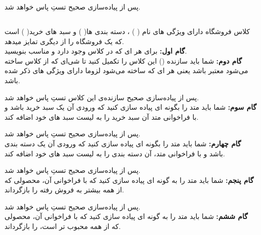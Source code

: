     پس از پیاده‌سازی صحیح تستِ 
    \grayBox{\textcolor{dkgreen}{CartCalculatePriceTest}}
    پاس خواهد شد.
    \subsection{ }
    کلاس فروشگاه دارای ویژگی های 
    نام (
    \grayBox{\textcolor{navyBlue}{Name}}
    )
    ، 
    دسته بندی ها(
    \grayBox{\textcolor{navyBlue}{Categories}}
    )
    و
    سبد های خرید(
    \grayBox{\textcolor{navyBlue}{Carts}}
    )
    است که یک فروشگاه را از دیگری تمایز میدهد.
    \\
    \textbf{گام اول:}
     برای هر 
    \grayBox{\textcolor{navyBlue}{property}}ای 
    که در کلاس وجود دارد 
    \grayBox{\textcolor{navyBlue}{getter}}
    و 
    \grayBox{\textcolor{navyBlue}{setter}}
    مناسب بنویسید.
    \\
    \textbf{گام دوم: }
    شما باید سازنده
    (\grayBox{\textcolor{navyBlue}{constructor}}) 
    این کلاس را تکمیل کنید تا شی‌ای که از کلاس ساخته می‌شود معتبر باشد یعنی هر 
    \grayBox{\textcolor{navyBlue}{Store}}ای 
    که ساخته می‌شود لزوما دارای ویژگی های ذکر شده باشد.
    
    پس از پیاده‌سازی صحیح سازنده‌ی این کلاس تستِ 
    \grayBox{\textcolor{dkgreen}{StoreConstructorTest}}
    پاس خواهد شد.
    \\
    \textbf{گام سوم: }
    شما باید متد 
    \grayBox{\textcolor{navyBlue}{AddCart}}
    را بگونه ای پیاده سازی کنید که ورودی آن یک سبد خرید باشد و با فراخوانی متد آن سبد خرید را به لیست سبد های خود اضافه کند.
    
    پس از پیاده‌سازی صحیح تستِ 
    \grayBox{\textcolor{dkgreen}{StoreAddCartTest}}
    پاس خواهد شد.
    \\
    \textbf{گام چهارم: }
    شما باید متد 
    \grayBox{\textcolor{navyBlue}{AddCategory}}
    را بگونه ای پیاده سازی کنید که 
    ورودی آن یک دسته بندی باشد و با فراخوانی متد، آن دسته بندی را به لیست سبد های خود اضافه کند.
    
    پس از پیاده‌سازی صحیح تستِ 
    \grayBox{\textcolor{dkgreen}{StoreAddCategoryTest}}
    پاس خواهد شد.
    \\
    \textbf{گام پنجم: }
    شما باید متد 
    \grayBox{\textcolor{navyBlue}{Bestselling}}
    را به گونه ای پیاده سازی کنید که 
    با فراخوانی آن، محصولی که از همه بیشتر به فروش رفته را بازگرداند.
    
    پس از پیاده‌سازی صحیح تستِ 
    \grayBox{\textcolor{dkgreen}{StoreBestsellingTest}}
    پاس خواهد شد.
    \\
    \textbf{گام ششم: }
    شما باید متد 
    \grayBox{\textcolor{navyBlue}{MostPopular}}
    را به گونه ای پیاده سازی کنید که 
    با فراخوانی آن، محصولی که از همه محبوب تر است، را بازگرداند.
    
